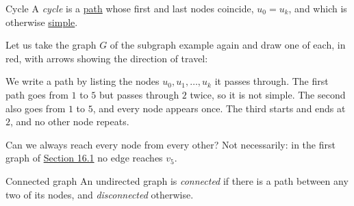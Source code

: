 \documentclass[a4paper,12pt,oneside]{report}
\begin{document}
\begin{frameddefn}{Cycle}\label{def:cycle}
A \emph{cycle} is a \hyperref[def:path]{path} whose first and last
nodes coincide, $u_0=u_k$, and which is otherwise
\hyperref[def:simple-path]{simple}.
\end{frameddefn}

Let us take the graph $G$ of the subgraph example again and draw one
of each, in red, with arrows showing the direction of travel:
\begin{center}
\end{center}
We write a path by listing the nodes $u_0,u_1,\ldots,u_k$ it passes
through. The first path goes from $1$ to $5$ but passes through $2$
twice, so it is not simple. The second also goes from $1$ to $5$, and
every node appears once. The third starts and ends at $2$, and no
other node repeats.

Can we always reach every node from every other? Not necessarily: in
the first graph of \hyperref[sec:graph-definitions]{Section 16.1} no
edge reaches $v_5$.

\begin{frameddefn}{Connected graph}\label{def:connected-graph}
An undirected graph is \emph{connected} if there is a path between
any two of its nodes, and \emph{disconnected} otherwise.
\end{frameddefn}
\end{document}
